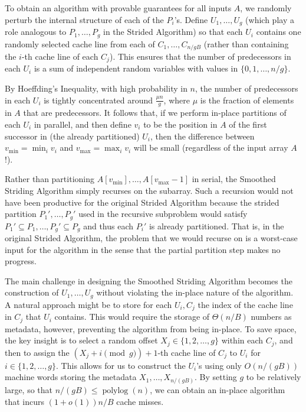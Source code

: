 \documentclass[a4paper,UKenglish,cleveref, autoref, thm-restate]{lipics-v2019}
\DeclareMathOperator{\polylog}{\text{polylog}}
\renewcommand{\paragraph}[1]{\vspace{0.09in}\noindent{\bf \boldmath #1.}}
\begin{document}

\paragraph{The Smoothed Striding Algorithm}
To obtain an algorithm with provable guarantees for all inputs $A$, we
randomly perturb the internal structure of each of the $P_i$'s. Define
$U_1, \ldots, U_{g}$ (which play a role analogous to $P_1,
\ldots, P_g$ in the Strided Algorithm) so that each $U_i$ contains one
randomly selected cache line from each of $C_1, \ldots, C_{n /
gB}$ (rather than containing the $i$-th cache line of each
$C_j$). This ensures that the number of predecessors in each $U_i$ is
a sum of independent random variables with values in $\{0, 1, \ldots,
n/g\}$.

By Hoeffding's Inequality, with high probability in $n$, the number of
predecessors in each $U_i$ is tightly concentrated around $\frac{\mu
n}{g}$, where $\mu$ is the fraction of elements in $A$ that are
predecessors. It follows that, if we perform in-place partitions of
each $U_i$ in parallel, and then define $v_i$ to be the position in
$A$ of the first successor in (the already partitioned) $U_i$, then
the difference between $v_{\text{min}} = \min_i v_i$ and
$v_{\text{max}} = \max_i v_i$ will be small (regardless of the input array
$A$!).

Rather than partitioning $A[v_{\text{min}}],\ldots,
A[v_{\text{max}}-1]$ in serial, the Smoothed Striding Algorithm simply
recurses on the subarray. Such a recursion would not have been
productive for the original Strided Algorithm because the strided
partition $P_1', \ldots, P_g'$ used in the recursive subproblem would
satisfy $P_1' \subseteq P_1, \ldots, P_g' \subseteq P_g$ and thus each
$P_i'$ is already partitioned. That is, in the original Strided
Algorithm, the problem that we would recurse on is a worst-case input
for the algorithm in the sense that the partial partition step makes
no progress.

The main challenge in designing the Smoothed Striding Algorithm
becomes the construction of $U_1, \ldots, U_{g}$ without
violating the in-place nature of the algorithm. A natural approach
might be to store for each $U_i, C_j$ the index of the cache
line in $C_j$ that $U_i$ contains. This would require the storage of
$\Theta(n / B)$ numbers as metadata, however, preventing the algorithm
from being in-place. To save space, the key insight is to select a
random offset $X_j \in \{1, 2, \ldots, g\}$ within each $C_j$, and
then to assign the $(X_j + i \pmod g) + 1$-th cache line of $C_j$ to
$U_i$ for $i \in \{1, 2, \ldots, g\}$. This allows for us to construct
the $U_i$'s using only $O(n/(gB))$ machine words
storing the metadata $X_1, \ldots, X_{n / (gB)}$. By setting $g$ to
be relatively large, so that $n/(gB) \le \polylog(n)$, we can
obtain an in-place algorithm that incurs $(1 + o(1))n/B$ cache
misses.
\end{document}
